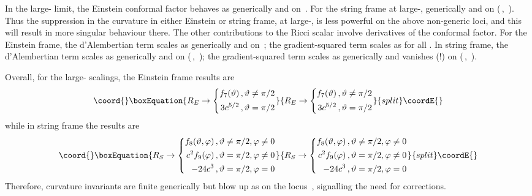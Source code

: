 \documentclass[a4paper,12pt]{amsproc}
\numberwithin{equation}{section}
\def\thalf{\mbox{\scriptsize{\myHighlight{${{3}\over{2}}$}\coordHE{}}}}
\def\vtpt{\myHighlight{$\vartheta=\pi/2$}\coordHE{}\,}
\def\vpz{\myHighlight{$\varphi=0$}\coordHE{}\,}
\begin{document}
In the large-\coordHE{} limit, the Einstein conformal factor behaves as
%
\coordHE{} generically and \coordHE{} on
\vtpt.
%
For the string frame at large-\coordHE{}, 
%
\coordHE{} generically and
\coordHE{} on (\vtpt, \vpz).
%
Thus the \coordHE{} suppression in the curvature in either Einstein
or string frame, at large-\coordHE{}, is less powerful on the above
non-generic loci, and this will result in more singular behaviour
there.
%
The other contributions to the Ricci scalar involve derivatives of the
conformal factor.  For the Einstein frame, the d'Alembertian term
scales as
%
\coordHE{} generically and \myHighlight{$\thalf c^3$}\coordHE{} on \vtpt;
%
the gradient-squared term scales as 
%
\coordHE{} for all \myHighlight{$\vartheta$}\coordHE{}.  
%
In string frame, the d'Alembertian term scales as
%
\coordHE{} generically and 
\coordHE{} on (\vtpt, \vpz);
%
the gradient-squared term scales as 
%
\coordHE{} generically and vanishes (!) on (\vtpt,
\vpz).

Overall, for the large-\coordHE{} scalings, the Einstein frame results are
%
\begin{equation}\coord{}\boxEquation{
R_E \rightarrow 
\left\{ \begin{split}
f_7(\vartheta) \,, \vartheta\not=\pi/2 \cr
3 c^{5/2} \,, \vartheta=\pi/2 \cr
\end{split} \right.
}{
R_E \rightarrow 
\left\{ \begin{split}
f_7(\vartheta) \,, \vartheta\not=\pi/2 \cr
3 c^{5/2} \,, \vartheta=\pi/2 \cr
\end{split} \right.
}{split}\coordE{}\end{equation}
%
while in string frame the results are
%
\begin{equation}\coord{}\boxEquation{
R_S \rightarrow
\left\{ \begin{split}
f_8(\vartheta,\varphi)  \,, \vartheta\not=\pi/2,\varphi\not=0 \cr
c^2 f_9(\varphi)\,, \vartheta    =\pi/2,\varphi\not=0 \cr
-24 c^3\,, \vartheta    =\pi/2,\varphi    =0 \cr
\end{split} \right.
}{
R_S \rightarrow
\left\{ \begin{split}
f_8(\vartheta,\varphi)  \,, \vartheta\not=\pi/2,\varphi\not=0 \cr
c^2 f_9(\varphi)\,, \vartheta    =\pi/2,\varphi\not=0 \cr
-24 c^3\,, \vartheta    =\pi/2,\varphi    =0 \cr
\end{split} \right.
}{split}\coordE{}\end{equation}
%
Therefore, curvature invariants are finite generically but blow up as
\coordHE{} on the locus \vtpt, signalling the need for
\coordHE{} corrections.
\end{document}
